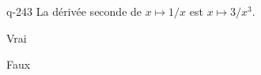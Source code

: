 \begin{truefalse}{q-243}
La dérivée seconde de $x\mapsto 1/x$ est $x\mapsto 3/x^3$.
\item Vrai
\item* Faux
\end{truefalse}

